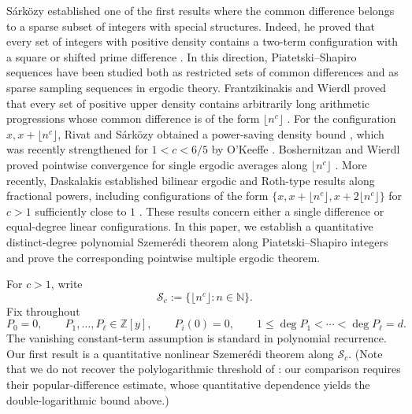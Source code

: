 \documentclass{amsart}
\newcommand{\N}{\mathbb N}
\newcommand{\Z}{\mathbb Z}
\newcommand{\1}{\mathbf 1}
\newcommand{\calS}{\mathcal S}
\begin{document}
Sárközy established one of the first results where the common difference belongs to a sparse subset of integers with special structures. Indeed, he proved that every set of integers with positive density contains a two-term configuration with a square or shifted prime difference \cite{SarkozySquares,SarkozyShiftedPrimes}. In this direction, Piatetski--Shapiro sequences have been studied both
as restricted sets of common differences and as sparse sampling
sequences in ergodic theory.
Frantzikinakis and Wierdl proved that every set of positive upper density
contains arbitrarily long arithmetic progressions whose common difference
is of the form $\lfloor n^c\rfloor$
\cite[Theorem~A]{FrantzikinakisWierdl}.  For the configuration 
$x,x+\lfloor n^c\rfloor$, Rivat and S\'ark\"ozy obtained a power-saving
density bound \cite{RivatSarkozy}, which was recently strengthened for
$1<c<6/5$ by O'Keeffe \cite[Theorem~1.3]{OKeeffe}.
Boshernitzan and Wierdl proved pointwise convergence for single ergodic
averages along $\lfloor n^c\rfloor$ \cite{BoshernitzanWierdl}.  More
recently, Daskalakis established bilinear ergodic and Roth-type results
along fractional powers,  including configurations of the form $\{ x,x+\lfloor n^c\rfloor,
 x+2\lfloor n^c\rfloor\}$
for $c>1$ sufficiently close to $1$
\cite[Theorem~1.7]{Daskalakis}.  These results concern either a single
difference or equal-degree linear configurations.   In this paper, we establish a quantitative
distinct-degree polynomial Szemer\'edi theorem along
Piatetski--Shapiro integers and prove the corresponding pointwise
multiple ergodic theorem.

For $c>1$, write
\[
 \calS_c:=\{\lfloor n^c\rfloor:n\in\N\}.
\]
Fix throughout
\begin{equation}\label{e:polynomials}
 P_0=0,\qquad P_1,\ldots,P_\ell\in\Z[y],\qquad
 P_i(0)=0,\qquad
 1\leq\deg P_1<\cdots<\deg P_\ell=d.
\end{equation}
The vanishing constant-term assumption is standard in polynomial
recurrence.
Our first result is a quantitative nonlinear Szemer\'edi theorem along $\mathcal{S}_c$. (Note that we do not recover the polylogarithmic threshold of \cite{ShaoWang}: our comparison requires their popular-difference estimate, whose quantitative dependence yields the double-logarithmic bound above.)
\end{document}
